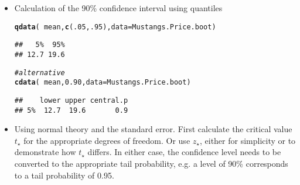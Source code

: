 \documentclass[11pt]{article}\usepackage[]{graphicx}\usepackage[]{color}
\makeatletter
\newcommand{\hlnum}[1]{\textcolor[rgb]{0.686,0.059,0.569}{#1}}%
\newcommand{\hlcom}[1]{\textcolor[rgb]{0.678,0.584,0.686}{\textit{#1}}}%
\newcommand{\hlopt}[1]{\textcolor[rgb]{0,0,0}{#1}}%
\newcommand{\hlstd}[1]{\textcolor[rgb]{0.345,0.345,0.345}{#1}}%
\newcommand{\hlkwc}[1]{\textcolor[rgb]{0.333,0.667,0.333}{#1}}%
\newcommand{\hlkwd}[1]{\textcolor[rgb]{0.737,0.353,0.396}{\textbf{#1}}}%
\newenvironment{kframe}{%
 \def\at@end@of@kframe{}%
 \ifinner\ifhmode%
  \def\at@end@of@kframe{\end{minipage}}%
  \begin{minipage}{\columnwidth}%
 \fi\fi%
 \def\FrameCommand##1{\hskip\@totalleftmargin \hskip-\fboxsep
 \colorbox{shadecolor}{##1}\hskip-\fboxsep
     \hskip-\linewidth \hskip-\@totalleftmargin \hskip\columnwidth}%
 \MakeFramed {\advance\hsize-\width
   \@totalleftmargin\z@ \linewidth\hsize
   \@setminipage}}%
 {\par\unskip\endMakeFramed%
 \at@end@of@kframe}
\newenvironment{knitrout}{}{} %
\makeatother
\begin{document}
\begin{itemize}

\item Calculation of the 90\% confidence interval using quantiles
\begin{knitrout}
\color{fgcolor}\begin{kframe}
\begin{alltt}
\hlkwd{qdata}\hlstd{(}\hlopt{~} \hlstd{mean,} \hlkwd{c}\hlstd{(}\hlnum{.05}\hlstd{,} \hlnum{.95}\hlstd{),} \hlkwc{data} \hlstd{= Mustangs.Price.boot)}
\end{alltt}
\begin{verbatim}
##   5%  95% 
## 12.7 19.6
\end{verbatim}
\begin{alltt}
\hlcom{# alternative}
\hlkwd{cdata}\hlstd{(}\hlopt{~} \hlstd{mean,} \hlnum{0.90}\hlstd{,} \hlkwc{data} \hlstd{= Mustangs.Price.boot)}
\end{alltt}
\begin{verbatim}
##    lower upper central.p
## 5%  12.7  19.6       0.9
\end{verbatim}
\end{kframe}
\end{knitrout}

\item Using normal theory and the standard error.
First calculate the critical value $t_\star$ for
the appropriate degrees of freedom.  Or use $z_\star$, either for simplicity or to demonstrate how $t_\star$ differs.  In either case, the confidence level needs to be converted to the appropriate tail probability, e.g. a level of 90\% corresponds to a tail probability of 0.95.


\end{itemize}
\end{document}
